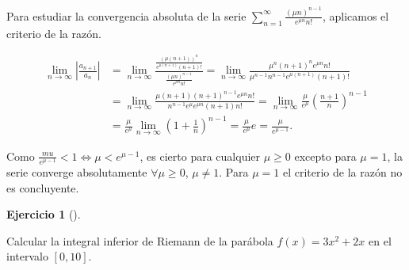 \documentclass[
  a4paper,
]{scrreport}
\theoremstyle{definition}
\newtheorem{exercise}{Ejercicio}[chapter]
\theoremstyle{remark}
\begin{document}
\begin{tcolorbox}[enhanced jigsaw, opacityback=0, title=\textcolor{quarto-callout-tip-color}{\faLightbulb}\hspace{0.5em}{Solución}, toptitle=1mm, colframe=quarto-callout-tip-color-frame, leftrule=.75mm, breakable, colback=white, left=2mm, bottomtitle=1mm, rightrule=.15mm, opacitybacktitle=0.6, arc=.35mm, coltitle=black, titlerule=0mm, colbacktitle=quarto-callout-tip-color!10!white, bottomrule=.15mm, toprule=.15mm]

Para estudiar la convergencia absoluta de la serie
\(\sum_{n=1}^\infty \frac{(\mu n)^{n-1}}{e^{\mu n}n!}\), aplicamos el
criterio de la razón.

\begin{align*}
\lim_{n\to\infty} \left|\frac{a_{n+1}}{a_n}\right| 
&= \lim_{n\to\infty} \frac{\frac{(\mu(n+1))^n}{e^{\mu(n+1)}(n+1)!}}{\frac{(\mu n)^{n-1}}{e^{\mu n}n!}}
= \lim_{n\to\infty} \frac{\mu^n (n+1)^n e^{\mu n}n!}{\mu^{n-1}n^{n-1}e^{\mu(n+1)}(n+1)!} \\
&= \lim_{n\to\infty} \frac{\mu (n+1)(n+1)^{n-1} e^{\mu n}n!}{n^{n-1}e^{\mu}e^{\mu n}(n+1)n!} 
= \lim_{n\to\infty} \frac{\mu}{e^\mu}\left(\frac{n+1}{n}\right)^{n-1}\\
&= \frac{\mu}{e^\mu}\lim_{n\to\infty} \left(1+\frac{1}{n}\right)^{n-1} 
= \frac{\mu}{e^\mu} e 
= \frac{\mu}{e^{\mu-1}}. 
\end{align*}

Como \(\frac{mu}{e^{\mu-1}} < 1 \Leftrightarrow \mu < e^{\mu-1}\), es
cierto para cualquier \(\mu\geq 0\) excepto para \(\mu=1\), la serie
converge absolutamente \(\forall \mu\geq 0\), \(\mu\neq 1\). Para
\(\mu=1\) el criterio de la razón no es concluyente.

\end{tcolorbox}

\begin{exercise}[]\protect\hypertarget{exr-4}{}\label{exr-4}

Calcular la integral inferior de Riemann de la parábola \(f(x)=3x^2+2x\)
en el intervalo \([0,10]\).

\end{exercise}
\end{document}

